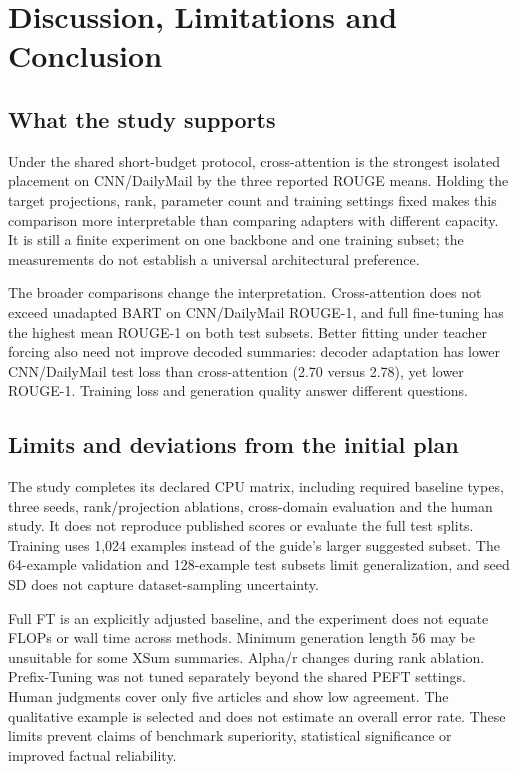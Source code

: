 \documentclass[11pt,letterpaper]{article}
\begin{document}
\section{Discussion, Limitations and Conclusion}
\subsection{What the study supports}
Under the shared short-budget protocol, cross-attention is the strongest isolated placement on CNN/DailyMail by the three reported ROUGE means. Holding the target projections, rank, parameter count and training settings fixed makes this comparison more interpretable than comparing adapters with different capacity. It is still a finite experiment on one backbone and one training subset; the measurements do not establish a universal architectural preference.

The broader comparisons change the interpretation. Cross-attention does not exceed unadapted BART on CNN/DailyMail ROUGE-1, and full fine-tuning has the highest mean ROUGE-1 on both test subsets. Better fitting under teacher forcing also need not improve decoded summaries: decoder adaptation has lower CNN/DailyMail test loss than cross-attention (2.70 versus 2.78), yet lower ROUGE-1. Training loss and generation quality answer different questions.
\subsection{Limits and deviations from the initial plan}
The study completes its declared CPU matrix, including required baseline types, three seeds, rank/projection ablations, cross-domain evaluation and the human study. It does not reproduce published scores or evaluate the full test splits. Training uses 1,024 examples instead of the guide's larger suggested subset. The 64-example validation and 128-example test subsets limit generalization, and seed SD does not capture dataset-sampling uncertainty.

Full FT is an explicitly adjusted baseline, and the experiment does not equate FLOPs or wall time across methods. Minimum generation length 56 may be unsuitable for some XSum summaries. Alpha/r changes during rank ablation. Prefix-Tuning was not tuned separately beyond the shared PEFT settings. Human judgments cover only five articles and show low agreement. The qualitative example is selected and does not estimate an overall error rate. These limits prevent claims of benchmark superiority, statistical significance or improved factual reliability.
\end{document}
